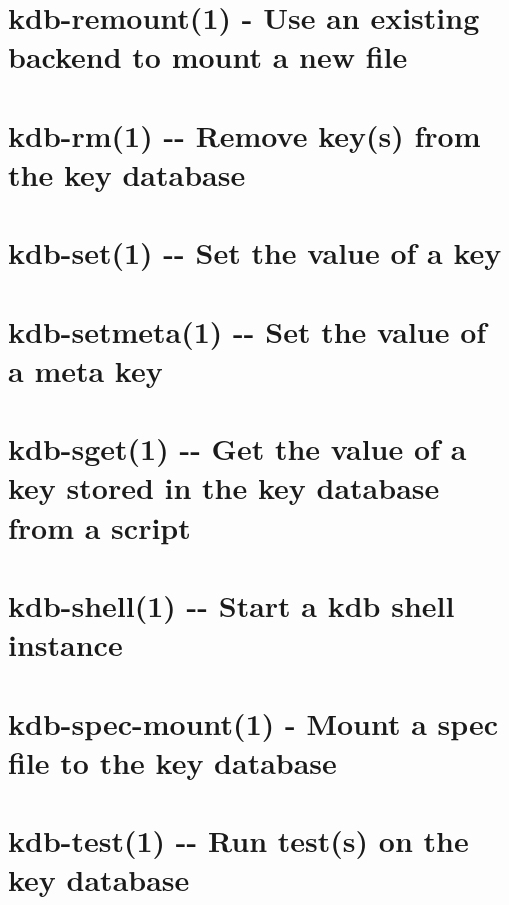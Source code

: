 \documentclass[twoside]{book}
\newcommand{\+}{\discretionary{\mbox{\scriptsize$\hookleftarrow$}}{}{}}
\begin{document}
\chapter{kdb-\/remount(1) -\/ Use an existing backend to mount a new file}
\label{md_doc_help_kdb-remount}
\hypertarget{md_doc_help_kdb-remount}{}

\chapter{kdb-\/rm(1) -\/-\/ Remove key(s) from the key database}
\label{md_doc_help_kdb-rm}
\hypertarget{md_doc_help_kdb-rm}{}

\chapter{kdb-\/set(1) -\/-\/ Set the value of a key}
\label{md_doc_help_kdb-set}
\hypertarget{md_doc_help_kdb-set}{}

\chapter{kdb-\/setmeta(1) -\/-\/ Set the value of a meta key}
\label{md_doc_help_kdb-setmeta}
\hypertarget{md_doc_help_kdb-setmeta}{}

\chapter{kdb-\/sget(1) -\/-\/ Get the value of a key stored in the key database from a script}
\label{md_doc_help_kdb-sget}
\hypertarget{md_doc_help_kdb-sget}{}

\chapter{kdb-\/shell(1) -\/-\/ Start a kdb shell instance}
\label{md_doc_help_kdb-shell}
\hypertarget{md_doc_help_kdb-shell}{}

\chapter{kdb-\/spec-\/mount(1) -\/ Mount a spec file to the key database}
\label{md_doc_help_kdb-spec-mount}
\hypertarget{md_doc_help_kdb-spec-mount}{}

\chapter{kdb-\/test(1) -\/-\/ Run test(s) on the key database}
\label{md_doc_help_kdb-test}
\hypertarget{md_doc_help_kdb-test}{}

\end{document}
